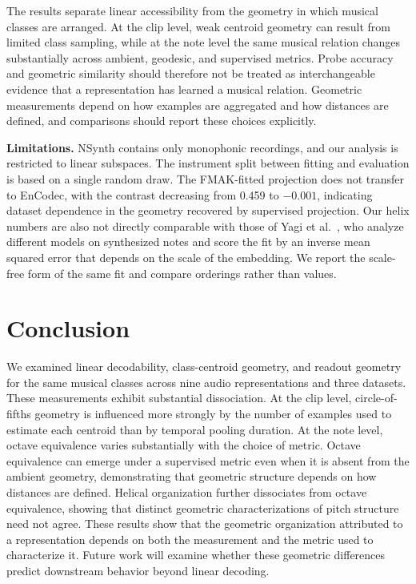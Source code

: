 \documentclass{article}
\begin{document}
The results separate linear accessibility from the geometry in which musical classes are arranged. At the clip level, weak centroid geometry can result from limited class sampling, while at the note level the same musical relation changes substantially across ambient, geodesic, and supervised metrics. Probe accuracy and geometric similarity should therefore not be treated as
interchangeable evidence that a representation has learned a musical relation.
Geometric measurements depend on how examples are aggregated and how distances
are defined, and comparisons should report these choices explicitly.

\noindent\textbf{Limitations.} NSynth contains only monophonic recordings, and our analysis is restricted to linear subspaces. The instrument split between fitting and evaluation is based on a single random draw. The FMAK-fitted projection does not transfer to EnCodec, with the contrast decreasing from 0.459 to $-0.001$, indicating dataset dependence in the geometry recovered by supervised projection. Our helix numbers
are also not directly comparable with those of Yagi et al.~\cite{yagi2026}, who
analyze different models on synthesized notes and score the fit by an inverse
mean squared error that depends on the scale of the embedding. We report the
scale-free form of the same fit and compare orderings rather than values.

\section{Conclusion}
\label{pg:concl}

We examined linear decodability, class-centroid geometry, and readout geometry for the same musical classes across nine audio representations and three datasets. These measurements exhibit substantial dissociation. At the clip level, circle-of-fifths geometry is influenced more strongly by the number of examples used to estimate each centroid than by temporal pooling duration. At the note level, octave equivalence varies substantially with the choice of metric. Octave equivalence can emerge under a supervised metric even when it is absent from the ambient geometry, demonstrating that geometric structure depends on how distances are defined. Helical organization further dissociates from octave equivalence, showing that distinct geometric characterizations of pitch structure need not agree. These results show that the geometric organization attributed to a representation depends on both the measurement and the metric used to characterize it. Future work will examine whether these geometric differences predict downstream behavior beyond linear decoding.

\newpage

\label{pg:endtext}



\end{document}
